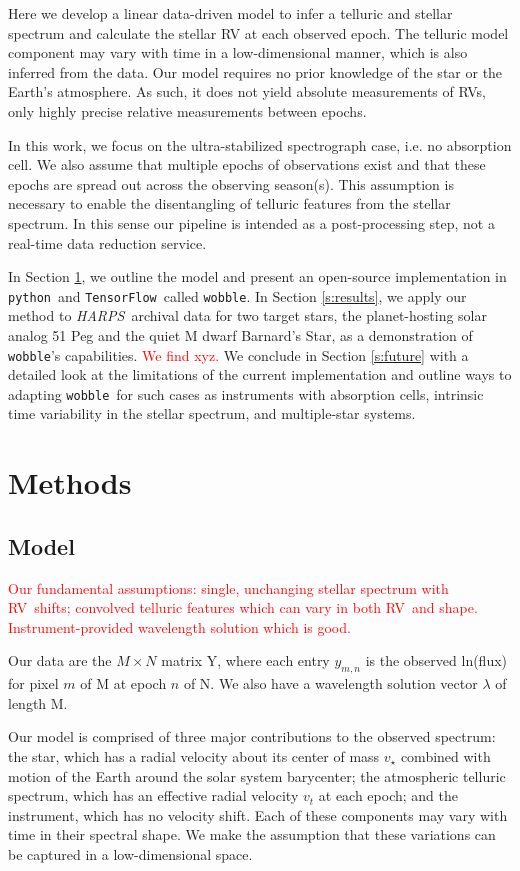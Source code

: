 \documentclass[twocolumn]{aastex62}
\newcommand{\todo}[1]{\textcolor{red}{#1}}  %
\newcommand{\acronym}[1]{{\small{#1}}}
\newcommand{\project}[1]{\textsl{#1}}
\newcommand{\code}[1]{\texttt{#1}}
\newcommand{\HARPS}{\project{\acronym{HARPS}}}
\newcommand{\RV}{\acronym{RV}}
\newcommand{\wobble}{\code{wobble}}
\newcommand{\TF}{\code{TensorFlow}}
\newcommand{\python}{\code{python}}
\newcommand{\Mdwarf}{Barnard's Star}
\begin{document}
Here we develop a linear data-driven model to infer a telluric and stellar spectrum and calculate the stellar RV at each observed epoch. 
The telluric model component may vary with time in a low-dimensional manner, which is also inferred from the data. 
Our model requires no prior knowledge of the star or the Earth's atmosphere. 
As such, it does not yield absolute measurements of \RV s, only highly precise relative measurements between epochs.

In this work, we focus on the ultra-stabilized spectrograph case, i.e. no absorption cell. 
We also assume that multiple epochs of observations exist and that these epochs are spread out across the observing season(s). 
This assumption is necessary to enable the disentangling of telluric features from the stellar spectrum. 
In this sense our pipeline is intended as a post-processing step, not a real-time data reduction service. 

In Section \ref{s:methods}, we outline the model and present an open-source implementation in \python\ and \TF\ called \wobble. 
In Section \ref{s:results}, we apply our method to \HARPS\ archival data for two target stars, the planet-hosting solar analog 51 Peg and the quiet M dwarf \Mdwarf, as a demonstration of \wobble's capabilities. 
\todo{We find xyz.} 
We conclude in Section \ref{s:future} with a detailed look at the limitations of the current implementation and outline ways to adapting \wobble\ for such cases as instruments with absorption cells, intrinsic time variability in the stellar spectrum, and multiple-star systems.

\section{Methods}
\label{s:methods}
\subsection{Model}

\todo{Our fundamental assumptions: single, unchanging stellar spectrum with \RV\ shifts; convolved telluric features which can vary in both \RV\ and shape. Instrument-provided wavelength solution which is good.}

Our data are the $M \times N$ matrix Y, where each entry $y_{m,n}$ is the observed ln(flux) for pixel $m$ of M at epoch $n$ of N. We also have a wavelength solution vector $\lambda$ of length M.

Our model is comprised of three major contributions to the observed spectrum: the star, which has a radial velocity about its center of mass $v_{\star}$ combined with motion of the Earth around the solar system barycenter; the atmospheric telluric spectrum, which has an effective radial velocity $v_t$ at each epoch; and the instrument, which has no velocity shift. Each of these components may vary with time in their spectral shape. 
We make the assumption that these variations can be captured in a low-dimensional space.
\end{document}
